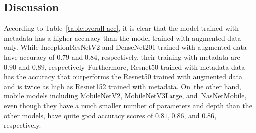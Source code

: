 \documentclass[sensors,article,accept,pdftex,moreauthors]{Definitions/mdpi}
\begin{document}
\subsection{Discussion} 

According to Table~\ref{table:overall-acc}, it is clear that the model trained with metadata has a higher accuracy than the model trained with augmented data only. While InceptionResNetV2 and DenseNet201 trained with augmented data have accuracy of $0.79$ and $0.84$, respectively, their training with metadata are $0.90$ and $0.89$, respectively. Furthermore, Resnet50 trained with metadata data has the accuracy that outperforms the Resnet50 trained with augmented data and is twice as high as Resnet152 trained with metadata. On~the other hand, mobile models including MobileNetV2, MobileNetV3Large, and~NasNetMobile, even though they have a much smaller number of parameters and depth than the other models, have quite good accuracy scores of $0.81$, $0.86$, and $0.86$, respectively. 
\end{document}
